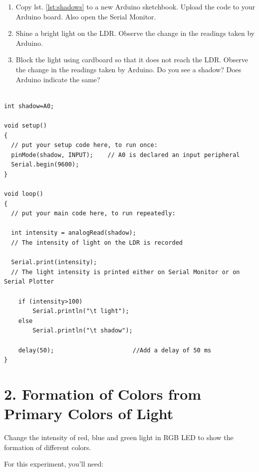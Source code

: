 \begin{enumerate}[leftmargin=*]
    \item Copy lst. \ref{lst:shadows} to a new Arduino sketchbook. Upload the code to your Arduino board. Also open the Serial Monitor.
    \item Shine a bright light on the LDR. Observe the change in the readings taken by Arduino.
    \item Block the light using cardboard so that it does not reach the LDR. Observe the change in the readings taken by Arduino. Do you see a shadow? Does Arduino indicate the same?
\end{enumerate}
\begin{lstlisting}[language=Arduino, numbers=none, caption={Arduino code for measuring the intensity of light measured by LDR}, captionpos=b, label={lst:shadows}]

int shadow=A0;  

void setup() 
{
  // put your setup code here, to run once:
  pinMode(shadow, INPUT);    // A0 is declared an input peripheral
  Serial.begin(9600);
}

void loop() 
{
  // put your main code here, to run repeatedly:
  
  int intensity = analogRead(shadow);    
  // The intensity of light on the LDR is recorded
  
  Serial.print(intensity);          
  // The light intensity is printed either on Serial Monitor or on Serial Plotter
  
    if (intensity>100)
        Serial.println("\t light");
    else
        Serial.println("\t shadow");
        
    delay(50);                      //Add a delay of 50 ms
}

\end{lstlisting}
\section*{2. Formation of Colors from Primary Colors of Light}
Change the intensity of red, blue and green light in RGB LED to show the formation of different colors.

For this experiment, you'll need:

